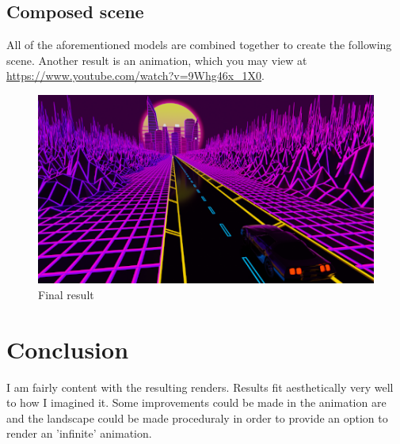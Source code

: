 \documentclass[12pt,a4paper,titlepage,final]{report}
\begin{document}
\subsection{Composed scene}
All of the aforementioned models are combined together to create the following scene. Another result is an animation, which you may view at \url{https://www.youtube.com/watch?v=9Whg46x_1X0}.
\begin{figure}[H]
    \centering
    \includegraphics{images/render_small.png}
    \caption{Final result}
    \label{fig:final_scene}
\end{figure}

\section{Conclusion}
I am fairly content with the resulting renders. Results fit aesthetically very well to how I imagined it. Some improvements could be made in the animation are and the landscape could be made proceduraly in order to provide an option to render an 'infinite' animation.

\newpage
\listoffigures


\begin{flushleft}
  
\end{flushleft}
\end{document}
